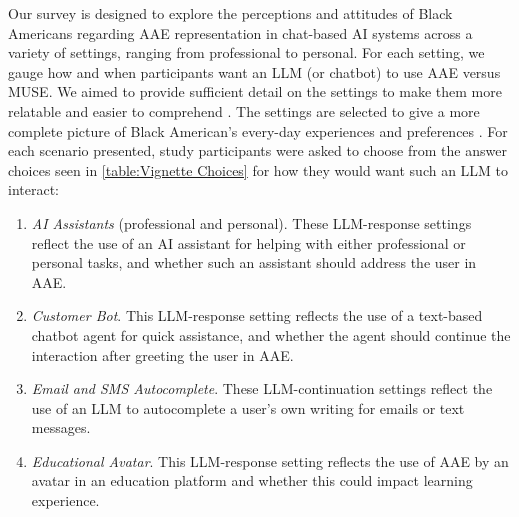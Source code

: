 Our survey is designed to explore the perceptions and attitudes of Black Americans regarding AAE representation in chat-based AI systems across a variety of settings, ranging from professional to personal. For each setting, we gauge how and when participants want an LLM (or chatbot) to use AAE versus MUSE. We aimed to provide sufficient detail on the settings to make them more relatable and easier to comprehend \cite{lenzner2012effects}. The settings are selected to give a more complete picture of Black American's every-day experiences and preferences \cite{Maedche2019AI-Based}. For each scenario presented, study participants were asked to choose from the answer choices seen in \autoref{table:Vignette Choices} for how they would want such an LLM to interact:




\begin{enumerate}
\item \textit{AI Assistants} (professional and personal).
These LLM-response settings reflect the use of an AI assistant for helping with either professional or personal tasks, and whether such an assistant should address the user in AAE.


\item\textit{Customer Bot}. This LLM-response setting reflects the use of a text-based chatbot agent for quick assistance, and whether the agent should continue the interaction after greeting the user in AAE.

\item \textit{Email and SMS Autocomplete}. These LLM-continuation settings reflect the use of an LLM to autocomplete a user's own writing for emails or text messages.  %

\item \textit{Educational Avatar}. This LLM-response setting reflects the use of AAE by an avatar in an education platform and whether this could impact learning experience.
\end{enumerate}

